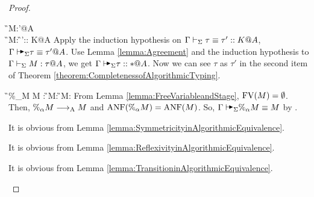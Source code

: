 \begin{proof}
    \begin{rneqncase}{\TConv}{
            \G\V M:\tau'@A \\
            \G\V M:\tau@A {}
            \G\V \tau\equiv \tau':: K@A
        }
        Apply the induction hypothesis on \( \Gamma\vdash_\Sigma \tau\equiv \tau':: K@A \), \(
        \G\AVS \tau\equiv \tau' @A \).  Use Lemma \ref{lemma:Agreement} and the
        induction hypothesis to \( \Gamma\vdash_\Sigma M : \tau @A \), we get \( \G\AVS \tau
        :: * @ A \). Now we can see \( \tau \) as \( \tau' \) in the second
        item of Theorem \ref{theorem:CompletenessofAlgorithmicTyping}.
    \end{rneqncase}
    \begin{rneqncase}{\QPercent}{
            \G\V\%_\alpha M \E M : 
            \G\V M: 
            \G\V M:\tau@A
        }
        From Lemma \ref{lemma:FreeVariableandStage}, \( \text{FV}(M) = \emptyset \). Then, \( \%_\alpha M \longrightarrow_{\text{A}} M \) and \( \text{ANF}(\%_\alpha M) = \text{ANF}(M) \). So, \( \G\AVS\%_\alpha M \E M \) by \QAANF.
    \end{rneqncase}
    \begin{rneqncase}{\QKSym}{}
        It is obvious from Lemma \ref{lemma:SymmetricityinAlgorithmicEquivalence}.
    \end{rneqncase}
    \begin{rneqncase}{\QKRefl}{}
        It is obvious from Lemma \ref{lemma:ReflexivityinAlgorithmicEquivalence}.
    \end{rneqncase}
    \begin{rneqncase}{\QKTrans}{}
        It is obvious from Lemma \ref{lemma:TransitioninAlgorithmicEquivalence}.
    \end{rneqncase}
\end{proof}
